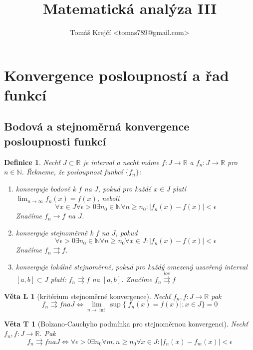 \documentclass[11pt,a4paper]{article}
\title{Matematická analýza III}
\author{Tomáš Krejčí <tomas789@gmail.com>}
\newcounter{vety}
\newtheorem*{definice}{Definice}
\newtheorem{vetal}[vety]{Věta L}
\newtheorem{vetat}[vety]{Věta T}
\newcommand{\con}{\rightrightarrows}
\newcommand{\conloc}{\overset{loc}{\rightrightarrows}}
\begin{document}
\maketitle

\setcounter{section}{9}
\section{Konvergence posloupností a řad funkcí}

\subsection{Bodová a stejnoměrná konvergence posloupnosti funkcí}

\begin{definice}
Nechť $J \subset \mathbb{R}$ je interval a nechť máme $f : J \rightarrow \mathbb{R}$ a $f_n : J \rightarrow \mathbb{R}$ pro $n \in \mathbb{N}$. Řekneme, že posloupnost funkcí $\{f_n\}$:

\begin{enumerate}
\item \emph{konverguje bodově} k $f$ na $J$, pokud pro každé $x \in J$ platí $\lim_{n \rightarrow \infty} f_n(x) = f(x)$, neboli
$$\forall x \in J \forall \epsilon > 0 \exists n_0 \in \mathbb{N} \forall n \geq n_0 : |f_n(x) - f(x)| < \epsilon$$
Značíme $f_n \rightarrow f$ na $J$.
\item \emph{konverguje stejnoměrně} k $f$ na $J$, pokud
$$\forall \epsilon > 0 \exists n_0 \in \mathbb{N} \forall n \geq n_0 \forall x \in J : | f_n(x) - f(x) | < \epsilon$$
Značíme $f_n \con f$.
\item \emph{konverguje lokálně stejnoměrně}, pokud pro každý omezený uzavřený interval $[a, b] \subset J$ platí: $f_n \rightrightarrows f$ na $[a, b]$. Značíme $f_n \conloc f$
\end{enumerate}
\end{definice}

\begin{vetal}[kritérium stejnoměrné konvergence]
Nechť $f_n, f:J \rightarrow \mathbb{R}$ pak
$$f_n \con f na J \Leftrightarrow \lim_{n \rightarrow \inf} \sup \{ |f_n(x) = f(x)|; x \in J \} = 0$$
\end{vetal}

\begin{vetat}[Bolzano-Cauchyho podmínka pro stejnoměrnou konvergenci]
Nechť $f_n,f : J \rightarrow \mathbb{R}$. Pak
$$f_n \con f na J \Leftrightarrow \forall \epsilon > 0 \exists n_0 \forall m,n \geq n_0 \forall x \in J : | f_n(x) - f_m(x)| < \epsilon$$
\end{vetat}
\end{document}

